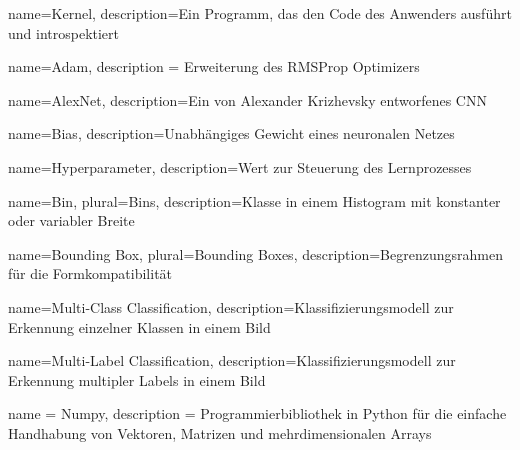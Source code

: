 
%
%

%
%

	{name={Kernel}, 
	description={Ein Programm, das den Code des Anwenders ausführt und introspektiert}
	}
	
	{name={Adam},
	description = {Erweiterung des RMSProp Optimizers}
	}
	
	{name={AlexNet}, 
	description={Ein von Alexander Krizhevsky entworfenes \ac{CNN}}
	}

	{name={Bias}, 
	description={Unabhängiges Gewicht eines neuronalen Netzes}
	}
	
	{name={Hyperparameter},
	description={Wert zur Steuerung des Lernprozesses}
	}

	{
	name={Bin},
	plural={Bins},
	description={Klasse in einem Histogram mit konstanter oder variabler Breite}
	}
	
	{
	name={Bounding Box},
	plural={Bounding Boxes},
	description={Begrenzungsrahmen für die Formkompatibilität}
	}
	
	{
	name={Multi-Class Classification},
	description={Klassifizierungsmodell zur Erkennung einzelner Klassen in einem Bild}
	}
	
	{
	name={Multi-Label Classification},
	description={Klassifizierungsmodell zur Erkennung multipler Labels in einem Bild}
	}
	
	{
	name = {Numpy},
	description = {Programmierbibliothek in Python für die einfache Handhabung von Vektoren, Matrizen und mehrdimensionalen Arrays}
	}
